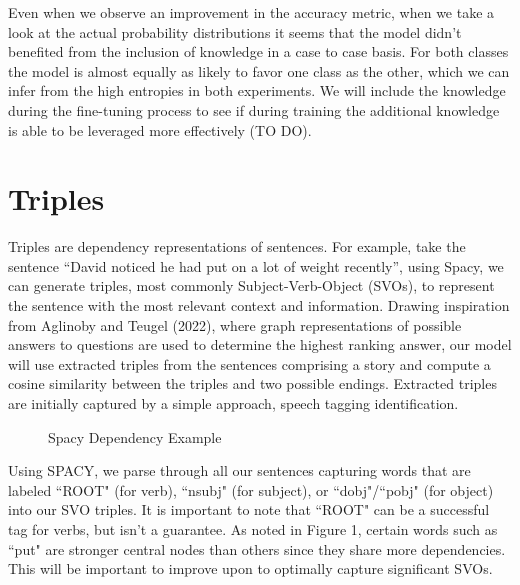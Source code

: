 \documentclass{article}
\begin{document}
\begin{multicols}{2}
Even when we observe an improvement in the accuracy metric, when we take a look at the actual probability distributions it seems that the model didn't benefited from the inclusion of knowledge in a case to case basis. For both classes the model is almost equally as likely to favor one class as the other, which we can infer from the high entropies in both experiments. We will include the knowledge during the fine-tuning process to see if during training the additional knowledge is able to be leveraged more effectively (TO DO).


\section{Triples}
Triples are dependency representations of sentences. For example, take the sentence ``David noticed he had put on a lot of weight recently'', using Spacy, we can generate triples, 
most commonly Subject-Verb-Object (SVOs), to represent the sentence with the most relevant context and information. Drawing inspiration from 
Aglinoby and Teugel (2022), where graph representations of possible answers to questions are used to determine the highest ranking answer, our model will use 
extracted triples from the sentences comprising a story and compute a cosine similarity between the triples and two possible endings. Extracted 
triples are initially captured by a simple approach, speech tagging identification.

\begin{figure}[H]
    \centering
    \caption{Spacy Dependency Example}
\end{figure}

Using SPACY, we parse through all our sentences capturing words that are labeled ``ROOT" (for verb), ``nsubj" (for subject), or ``dobj"/``pobj" (for object) 
into our SVO triples. It is important to note that ``ROOT" can be a successful tag for verbs, but isn't a guarantee. As noted in Figure 1, certain words 
such as ``put" are stronger central nodes than others since they share more dependencies.  This will be important to improve upon to optimally capture 
significant SVOs.


\end{multicols}
\end{document}
